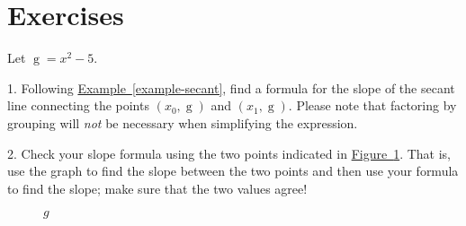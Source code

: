 \documentclass[12pt,]{book}
\theoremstyle{plain}
\theoremstyle{definition}
\numberwithin{equation}{section}
\providecommand\phantomsection{}
\newcommand{\fe}[2]{\mathop{{#1}{\left(#2\right)}}}
\newcommand{\point}[2]{\left(#1,#2\right)}
\begin{document}
\typeout{************************************************}
\typeout{************************************************}
\section*{Exercises}\label{exercises-2}

Let \(\fe{g}{x}=x^2-5\).%
\begin{exerciselist}
\item[1.]\phantomsection\hypertarget{exercise-7}{\null}Following \hyperref[example-secant]{Example~\ref*{example-secant}}, find a formula for the slope of the secant line connecting the points \(\point{x_0}{\fe{g}{x_0}}\) and \(\point{x_1}{\fe{g}{x_1}}\). Please note that factoring by grouping will \emph{not} be necessary when simplifying the expression.%
\par\smallskip
\item[2.]\phantomsection\hypertarget{exercise-8}{\null}Check your slope formula using the two points indicated in \hyperref[figure-secant-exercise]{Figure~\ref*{figure-secant-exercise}}. That is, use the graph to find the slope between the two points and then use your formula to find the slope; make sure that the two values agree!%
\begin{figure}
\centering
{
}
\caption{\(g\)\label{figure-secant-exercise}}
\end{figure}
\par\smallskip
\end{exerciselist}
\typeout{************************************************}
\typeout{************************************************}
\end{document}
